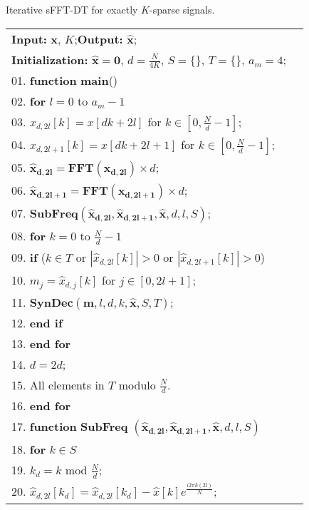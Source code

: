 \documentclass[journal,onecolumn,11pt]{IEEEtran}
\begin{document}
\begin{algorithm}[!htb]
\fontsize{11pt}{0.9em}\selectfont
\setlength{\abovecaptionskip}{0pt}
\setlength{\belowcaptionskip}{0pt}
\caption{Iterative sFFT-DT for exactly $K$-sparse signals.}
\label{Table:our algorithm}
\begin{tabular}[t]{p{17.7cm}l}
\textbf{Input:} $\bm{x}$, $K$;\quad \textbf{Output:} $\bm{\hat{x}}$; \\
\textbf{Initialization:} $\bm{\hat{x}}=\mathbf{0}$, $  d=\frac{N}{4K}$, $S=\{ \}$, $T=\{ \}$, $a_{m}=4$; \\
\hline\hline
01. \textbf{function} \textbf{main}()\\
02. \quad\textbf{for} $l = 0$ to $a_{m} -1$ \\
03. \quad\quad $x_{d,2l}[k]=x[dk+2l]$ for $  k\in [0,\frac{N}{d}-1]$;\\
04. \quad\quad $x_{d,2l+1}[k]=x[dk+2l+1]$ for $  k\in [0,\frac{N}{d}-1]$;\\
05. \quad\quad $\bm{\hat{x}_{d,2l}}=\mathbf{FFT}( \bm{x_{d,2l}} )\times d$;\\
06. \quad\quad $\bm{\hat{x}_{d,2l+1}}=\mathbf{FFT}( \bm{x_{d,2l+1}} )\times d$;\\
07. \quad\quad $\mathbf{SubFreq}(\bm{\hat{x}_{d,2l}},\bm{\hat{x}_{d,2l+1}},\bm{\hat{x}},d,l,S)$;\\
08. \quad\quad \textbf{for} $k = 0$ to $  \frac{N}{d}-1$\\
09. \quad\quad \quad \textbf{if} ($k \in T$ or $|\hat{x}_{d,2l}[k]| > 0$ or $|\hat{x}_{d,2l+1}[k]| > 0$) \\
10. \quad\quad \quad \quad $m_{j}= \hat{x}_{d,j}[k]$ for $j \in [0,2l+1]$; \\
11. \quad\quad \quad \quad $\mathbf{SynDec}(\bm{m},l,d,k,\bm{\hat{x}},S,T)$;\\
12. \quad\quad \quad \textbf{end if}\\
13. \quad\quad \textbf{end for} \\
14. \quad\quad $d=2d$; \\
15. \quad\quad All elements in $T$ modulo $  \frac{N}{d}$.\\
16. \quad\textbf{end for}\\
17. \textbf{function} \textbf{SubFreq} $(\bm{\hat{x}_{d,2l}},\bm{\hat{x}_{d,2l+1}},\bm{\hat{x}},d,l,S)$\\
18. \quad \textbf{for} $k \in S$\\
19. \quad \quad $k_{d}=k $ mod $   \frac{N}{d}$;\\
20. \quad \quad $   \hat{x}_{d,2l}[k_{d}]=\hat{x}_{d,2l}[k_{d}]- \hat{x}[k]e^{\frac{i2\pi k(2l)}{N}} $;\\

\end{tabular}
\end{algorithm}
\end{document}
